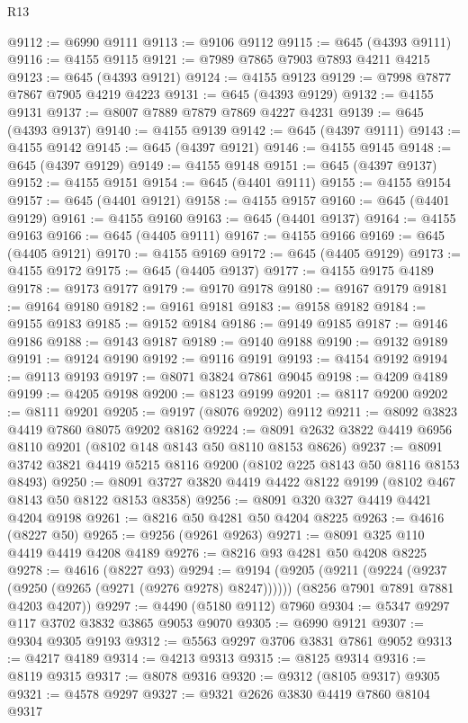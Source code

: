 \begin{lexlean}{R13}
\begin{coremodule}
@9112 := @6990 @9111
@9113 := @9106 @9112
@9115 := @645 (@4393 @9111)
@9116 := @4155 @9115
@9121 := @7989 @7865 @7903 @7893 @4211 @4215
@9123 := @645 (@4393 @9121)
@9124 := @4155 @9123
@9129 := @7998 @7877 @7867 @7905 @4219 @4223
@9131 := @645 (@4393 @9129)
@9132 := @4155 @9131
@9137 := @8007 @7889 @7879 @7869 @4227 @4231
@9139 := @645 (@4393 @9137)
@9140 := @4155 @9139
@9142 := @645 (@4397 @9111)
@9143 := @4155 @9142
@9145 := @645 (@4397 @9121)
@9146 := @4155 @9145
@9148 := @645 (@4397 @9129)
@9149 := @4155 @9148
@9151 := @645 (@4397 @9137)
@9152 := @4155 @9151
@9154 := @645 (@4401 @9111)
@9155 := @4155 @9154
@9157 := @645 (@4401 @9121)
@9158 := @4155 @9157
@9160 := @645 (@4401 @9129)
@9161 := @4155 @9160
@9163 := @645 (@4401 @9137)
@9164 := @4155 @9163
@9166 := @645 (@4405 @9111)
@9167 := @4155 @9166
@9169 := @645 (@4405 @9121)
@9170 := @4155 @9169
@9172 := @645 (@4405 @9129)
@9173 := @4155 @9172
@9175 := @645 (@4405 @9137)
@9177 := @4155 @9175 @4189
@9178 := @9173 @9177
@9179 := @9170 @9178
@9180 := @9167 @9179
@9181 := @9164 @9180
@9182 := @9161 @9181
@9183 := @9158 @9182
@9184 := @9155 @9183
@9185 := @9152 @9184
@9186 := @9149 @9185
@9187 := @9146 @9186
@9188 := @9143 @9187
@9189 := @9140 @9188
@9190 := @9132 @9189
@9191 := @9124 @9190
@9192 := @9116 @9191
@9193 := @4154 @9192
@9194 := @9113 @9193
@9197 := @8071 @3824 @7861 @9045
@9198 := @4209 @4189
@9199 := @4205 @9198
@9200 := @8123 @9199
@9201 := @8117 @9200
@9202 := @8111 @9201
@9205 := @9197 (@8076 @9202) @9112
@9211 := @8092 @3823 @4419 @7860 @8075 @9202 @8162
@9224 := @8091 @2632 @3822 @4419 @6956 @8110 @9201 (@8102 @148 @8143 @50 @8110 @8153 @8626)
@9237 := @8091 @3742 @3821 @4419 @5215 @8116 @9200 (@8102 @225 @8143 @50 @8116 @8153 @8493)
@9250 := @8091 @3727 @3820 @4419 @4422 @8122 @9199 (@8102 @467 @8143 @50 @8122 @8153 @8358)
@9256 := @8091 @320 @327 @4419 @4421 @4204 @9198
@9261 := @8216 @50 @4281 @50 @4204 @8225
@9263 := @4616 (@8227 @50)
@9265 := @9256 (@9261 @9263)
@9271 := @8091 @325 @110 @4419 @4419 @4208 @4189
@9276 := @8216 @93 @4281 @50 @4208 @8225
@9278 := @4616 (@8227 @93)
@9294 := @9194
    (@9205
      (@9211 (@9224 (@9237 (@9250 (@9265 (@9271 (@9276 @9278) @8247))))))
      (@8256 @7901 @7891 @7881 @4203 @4207))
@9297 := @4490 (@5180 @9112) @7960
@9304 := @5347 @9297 @117 @3702 @3832 @3865 @9053 @9070
@9305 := @6990 @9121
@9307 := @9304 @9305 @9193
@9312 := @5563 @9297 @3706 @3831 @7861 @9052
@9313 := @4217 @4189
@9314 := @4213 @9313
@9315 := @8125 @9314
@9316 := @8119 @9315
@9317 := @8078 @9316
@9320 := @9312 (@8105 @9317) @9305
@9321 := @4578 @9297
@9327 := @9321 @2626 @3830 @4419 @7860 @8104 @9317

\end{coremodule}
\end{lexlean}
